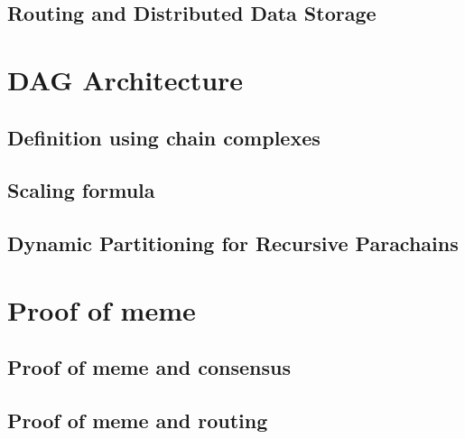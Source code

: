 \documentclass{article}
\begin{document}
\subsection{Routing and Distributed Data Storage}

\section{DAG Architecture}
\subsection{Definition using chain complexes}
\subsection{Scaling formula}
\subsection{Dynamic Partitioning for Recursive Parachains}


\section{Proof of meme}
\subsection{Proof of meme and consensus}
\subsection{Proof of meme and routing}



\end{document}
